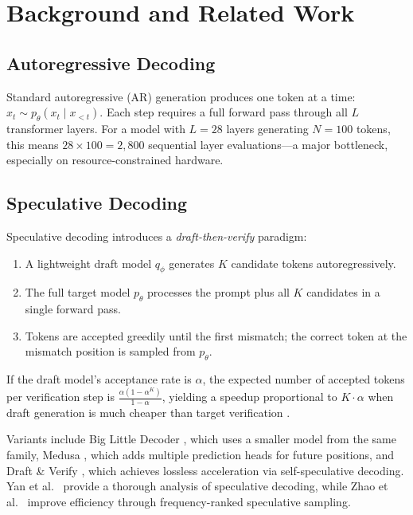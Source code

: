 \documentclass[11pt]{article}
\begin{document}
\section{Background and Related Work}
\label{sec:background}

\subsection{Autoregressive Decoding}

Standard autoregressive (AR) generation produces one token at a time: $x_t \sim p_\theta(x_t \mid x_{<t})$.  Each step requires a full forward pass through all $L$ transformer layers.  For a model with $L = 28$ layers generating $N = 100$ tokens, this means $28 \times 100 = 2{,}800$ sequential layer evaluations—a major bottleneck, especially on resource-constrained hardware.

\subsection{Speculative Decoding}

Speculative decoding \cite{leviathan2023fast,chen2023accelerating,stern2018blockwise} introduces a \emph{draft-then-verify} paradigm:
\begin{enumerate}
    \item A lightweight draft model $q_\phi$ generates $K$ candidate tokens autoregressively.
    \item The full target model $p_\theta$ processes the prompt plus all $K$ candidates in a single forward pass.
    \item Tokens are accepted greedily until the first mismatch; the correct token at the mismatch position is sampled from $p_\theta$.
\end{enumerate}

If the draft model's acceptance rate is $\alpha$, the expected number of accepted tokens per verification step is $\frac{\alpha(1 - \alpha^K)}{1 - \alpha}$, yielding a speedup proportional to $K \cdot \alpha$ when draft generation is much cheaper than target verification \cite{xia2024unlocking}.

Variants include Big Little Decoder \cite{kim2024speculative}, which uses a smaller model from the same family, Medusa \cite{cai2023medusa}, which adds multiple prediction heads for future positions, and Draft \& Verify \cite{zhang2023draft}, which achieves lossless acceleration via self-speculative decoding.  Yan et al.~\cite{yan2025decoding} provide a thorough analysis of speculative decoding, while Zhao et al.~\cite{zhao2025frspec} improve efficiency through frequency-ranked speculative sampling.
\end{document}
